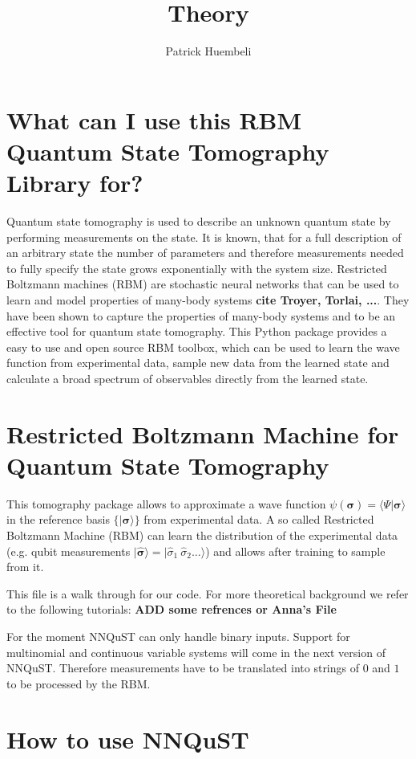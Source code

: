 \documentclass[a4paper]{article}
\title{Theory}
\author{Patrick Huembeli}
\begin{document}
\section{What can I use this RBM Quantum State Tomography Library for?}

Quantum state tomography is used to describe an unknown quantum state by performing measurements on the state. It is known, that for a full description of an arbitrary state the number of parameters and therefore measurements needed to fully specify the state grows exponentially with the system size. 
Restricted Boltzmann machines (RBM) are stochastic neural networks that can be used to learn and model properties of many-body systems \textbf{cite Troyer, Torlai, ...}. They have been shown to capture the properties of many-body systems and to be an effective tool for quantum state tomography.
This Python package provides a easy to use and open source RBM toolbox, which can be used to learn the wave function from experimental data, sample new data from the learned state and calculate a broad spectrum of observables directly from the learned state.


\section{Restricted Boltzmann Machine for Quantum State Tomography}


This tomography package allows to approximate a wave function $\psi( \boldsymbol{\sigma} )  = \langle \Psi \vert \boldsymbol{\sigma} \rangle$ in the reference basis $\{ \vert \boldsymbol{ \sigma} \rangle \}$ from experimental data. A so called Restricted Boltzmann Machine (RBM) can learn the distribution of the experimental data (e.g. qubit measurements $\vert \widehat{\boldsymbol{ \sigma}} \rangle = \vert \hat{ \sigma}_1~\hat{ \sigma}_2 \dots \rangle$) and allows after training to sample from it.

This file is a walk through for our code. For more theoretical background we refer to the following tutorials:
\textbf{ADD some refrences or Anna's File}

For the moment NNQuST can only handle binary inputs. Support for multinomial and continuous variable systems will come in the next version of NNQuST. Therefore measurements have to be translated into strings of $0$ and $1$ to be processed by the RBM.

\section{How to use NNQuST}
\end{document}
